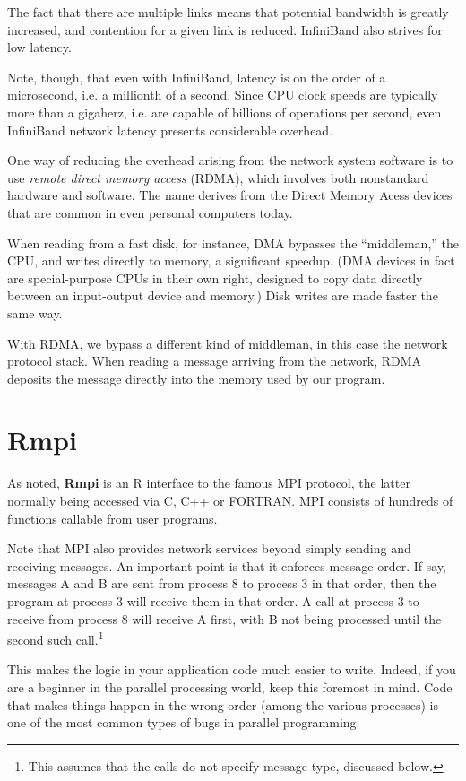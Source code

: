 The fact that there are multiple links means that potential bandwidth is
greatly increased, and contention for a given link is reduced.
InfiniBand also strives for low latency.  

Note, though, that even with InfiniBand, latency is on the order of a
microsecond, i.e. a millionth of a second.  Since CPU clock speeds are
typically more than a gigaherz, i.e. are capable of billions of
operations per second, even InfiniBand network latency presents
considerable overhead.

One way of reducing the overhead arising from the network system
software is to use {\it remote direct memory access} (RDMA), which
involves both nonstandard hardware and software.  The name derives from
the Direct Memory Acess devices that are common in even personal computers
today.  

When reading from a fast disk, for instance, DMA bypasses the
``middleman,'' the CPU, and writes directly to memory, a significant
speedup.  (DMA devices in fact are special-purpose CPUs in their own
right, designed to copy data directly between an input-output device and
memory.) Disk writes are made faster the same way.

With RDMA, we bypass a different kind of middleman, in this case the
network protocol stack.  When reading a message arriving from the
network, RDMA deposits the message directly into the memory used by our
program.

\section{Rmpi}

As noted, {\bf Rmpi} is an R interface to the famous MPI protocol,
the latter normally being accessed via C, C++ or FORTRAN.  MPI consists
of hundreds of functions callable from user programs.

Note that MPI also provides network services beyond simply sending and
receiving messages.  An important point is that it enforces message
order.  If say, messages A and B are sent from process 8 to process 3 in
that order, then the program at process 3 will receive them in that
order.  A call at process 3 to receive from process 8 will receive A
first, with B not being processed until the second such
call.\footnote{This assumes that the calls do not specify message type,
discussed below.}  

This makes the logic in your application code much easier to write.
Indeed, if you are a beginner in the parallel processing world, keep
this foremost in mind.  Code that makes things happen in the wrong order
(among the various processes) is one of the most common types of bugs in
parallel programming.


